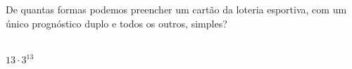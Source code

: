 \begin{ex}
  De quantas formas podemos preencher um cartão da loteria esportiva, com um único prognóstico duplo e todos os outros, simples?
    \begin{sol}
    \phantom{A}  \\
    $13\cdot3^{13}$
    \end{sol}
\end{ex}